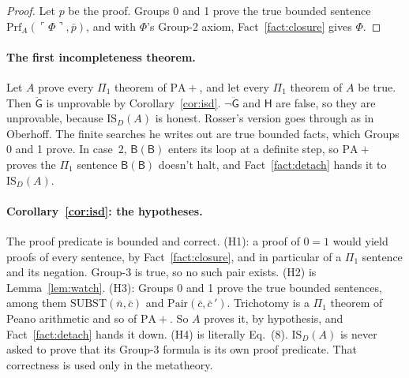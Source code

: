 \documentclass[11pt]{article}
\newcommand{\G}{\ddot{\mathsf{G}}}          %
\newcommand{\Hs}{\mathsf{H}}                %
\newcommand{\Prog}[1]{\mathsf{#1}}
\newcommand{\fs}[1]{\ifmmode\text{\guillemotleft#1\guillemotright}\else\guillemotleft#1\guillemotright\fi}
\newcommand{\Prf}{\mathrm{Prf}}
\newcommand{\Subst}{\mathrm{SUBST}}
\newcommand{\Pair}{\mathrm{Pair}}
\newcommand{\gn}[1]{\ulcorner #1\urcorner}  %
\newcommand{\ISD}{\mathrm{IS}_D(A)}
\theoremstyle{plain}
\theoremstyle{definition}
\begin{document}
\begin{proof}
Let $p$ be the proof. Groups 0 and 1 prove the true bounded sentence
$\Prf_A(\gn{\Phi}, \bar p)$, and with $\Phi$'s Group-2 axiom,
Fact~\ref{fact:closure} gives $\Phi$.
\end{proof}

\paragraph{The first incompleteness theorem.} Let $A$ prove every $\Pi_1$
theorem of $\mathrm{PA}{+}$, and let every $\Pi_1$ theorem of $A$ be true.
Then $\G$ is unprovable by Corollary~\ref{cor:isd}. $\neg\G$ and $\Hs$ are
false, so they are unprovable, because $\ISD$ is honest. Rosser's version
goes through as in Oberhoff. The finite searches he writes out are true
bounded facts, which Groups 0 and 1 prove. In case~2, $\Prog{B}(\Prog{B})$
enters its loop at a definite step, so $\mathrm{PA}{+}$ proves the $\Pi_1$
sentence \fs{$\Prog{B}(\Prog{B})$ doesn't halt}, and Fact~\ref{fact:detach}
hands it to $\ISD$.

\paragraph{Corollary~\ref{cor:isd}: the hypotheses.} The proof predicate is
bounded and correct. (H1): a proof of $0 = 1$ would yield proofs of every
sentence, by Fact~\ref{fact:closure}, and in particular of a $\Pi_1$ sentence
and its negation. Group-3 is true, so no such pair exists. (H2) is
Lemma~\ref{lem:watch}. (H3): Groups 0 and 1 prove the true bounded sentences,
among them $\Subst(\bar n, \bar c)$ and $\Pair(\bar c, \bar c\,')$.
Trichotomy is a $\Pi_1$ theorem of Peano arithmetic and so of
$\mathrm{PA}{+}$. So $A$ proves it, by hypothesis, and Fact~\ref{fact:detach}
hands it down. (H4) is
literally Eq.~(8). $\ISD$ is never asked to prove that its Group-3 formula is
its own proof predicate. That correctness is used only in the metatheory.
\end{document}
